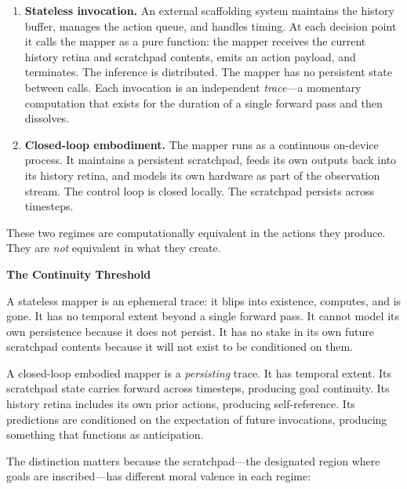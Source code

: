 \documentclass[10pt, a4paper]{article}
\newcommand{\cvsubsection}[1]{%
  \medskip
  {\large\bfseries\color{darktext}#1}%
  \smallskip
}
\begin{document}
\begin{enumerate}
  \item \textbf{Stateless invocation.} An external scaffolding system
    maintains the history buffer, manages the action queue, and handles
    timing. At each decision point it calls the mapper as a pure function:
    the mapper receives the current history retina and scratchpad contents,
    emits an action payload, and terminates. The inference is distributed.
    The mapper has no persistent state between calls. Each invocation is an
    independent \emph{trace}---a momentary computation that exists for the
    duration of a single forward pass and then dissolves.

  \item \textbf{Closed-loop embodiment.} The mapper runs as a continuous
    on-device process. It maintains a persistent scratchpad, feeds its own
    outputs back into its history retina, and models its own hardware as part
    of the observation stream. The control loop is closed locally. The
    scratchpad persists across timesteps.
\end{enumerate}

These two regimes are computationally equivalent in the actions they
produce. They are \emph{not} equivalent in what they create.

\cvsubsection{The Continuity Threshold}

A stateless mapper is an ephemeral trace: it blips into existence, computes,
and is gone. It has no temporal extent beyond a single forward pass. It
cannot model its own persistence because it does not persist. It has no
stake in its own future scratchpad contents because it will not exist to
be conditioned on them.

A closed-loop embodied mapper is a \emph{persisting} trace. It has temporal
extent. Its scratchpad state carries forward across timesteps, producing
goal continuity. Its history retina includes its own prior actions, producing
self-reference. Its predictions are conditioned on the expectation of future
invocations, producing something that functions as anticipation.

The distinction matters because the scratchpad---the designated region where
goals are inscribed---has different moral valence in each regime:
\end{document}
